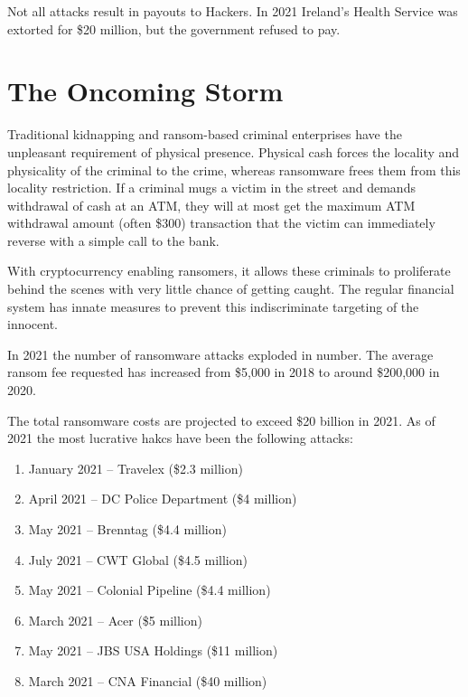 
Not all attacks result in payouts to Hackers. In 2021 Ireland's Health Service
was extorted for \$20 million, but the government refused to pay.

\section{The Oncoming Storm}

Traditional kidnapping and ransom-based criminal enterprises have the unpleasant
requirement of physical presence. Physical cash forces the locality and
physicality of the criminal to the crime, whereas ransomware frees them from
this locality restriction. If a criminal mugs a victim in the street and demands
withdrawal of cash at an ATM, they will at most get the maximum ATM withdrawal
amount (often \$300) transaction that the victim can immediately reverse with a
simple call to the bank.

With cryptocurrency enabling ransomers, it allows these criminals to proliferate
behind the scenes with very little chance of getting caught. The regular
financial system has innate measures to prevent this indiscriminate targeting of
the innocent.

In 2021 the number of ransomware attacks exploded in number. The average ransom
fee requested has increased from \$5,000 in 2018 to around \$200,000 in 2020.

The total ransomware costs are projected to exceed \$20 billion in 2021. As of
2021 the most lucrative hakcs have been the following attacks:

\begin{enumerate}
  \item January 2021 -- Travelex (\$2.3 million)
  \item April 2021 -- DC Police Department (\$4 million)
  \item May 2021 -- Brenntag (\$4.4 million)
  \item July 2021 -- CWT Global (\$4.5 million)
  \item May 2021 -- Colonial Pipeline (\$4.4 million)
  \item March 2021 -- Acer (\$5 million)
  \item May 2021 -- JBS USA Holdings (\$11 million)
  \item March 2021 -- CNA Financial (\$40 million)
\end{enumerate}

